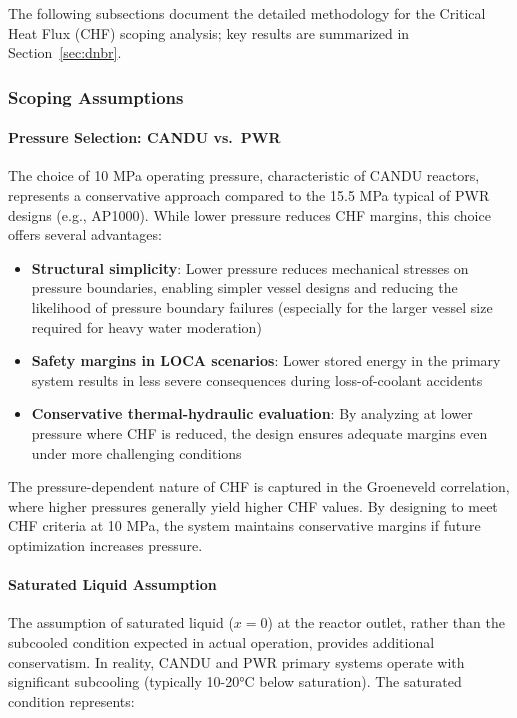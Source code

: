 

The following subsections document the detailed methodology for the Critical Heat Flux (CHF) scoping analysis; key results are summarized in Section~\ref{sec:dnbr}.

\subsubsection{Scoping Assumptions}
\paragraph{Pressure Selection: CANDU vs.\ PWR}

The choice of 10 MPa operating pressure, characteristic of CANDU reactors, represents a conservative approach compared to the 15.5 MPa typical of PWR designs (e.g., AP1000). While lower pressure reduces CHF margins, this choice offers several advantages:

\begin{itemize}
    \item \textbf{Structural simplicity}: Lower pressure reduces mechanical stresses on pressure boundaries, enabling simpler vessel designs and reducing the likelihood of pressure boundary failures (especially for the larger vessel size required for heavy water moderation)
    
    \item \textbf{Safety margins in LOCA scenarios}: Lower stored energy in the primary system results in less severe consequences during loss-of-coolant accidents
    
    \item \textbf{Conservative thermal-hydraulic evaluation}: By analyzing at lower pressure where CHF is reduced, the design ensures adequate margins even under more challenging conditions
\end{itemize}

The pressure-dependent nature of CHF is captured in the Groeneveld correlation, where higher pressures generally yield higher CHF values. By designing to meet CHF criteria at 10 MPa, the system maintains conservative margins if future optimization increases pressure.

\paragraph{Saturated Liquid Assumption}

The assumption of saturated liquid ($x = 0$) at the reactor outlet, rather than the subcooled condition expected in actual operation, provides additional conservatism. In reality, CANDU and PWR primary systems operate with significant subcooling (typically 10-20°C below saturation). The saturated condition represents:

